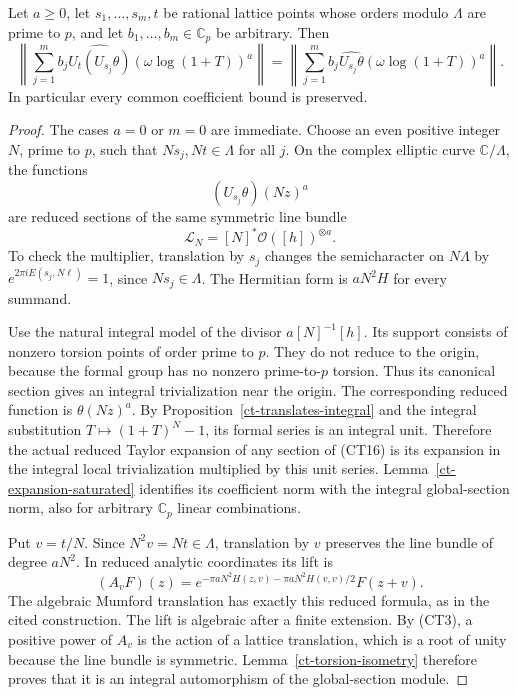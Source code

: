 \begin{theorem}\label{ct-combination-norm}
Let $a\ge0$, let $s_1,\ldots,s_m,t$ be rational lattice points
whose orders modulo $\Lambda$ are prime to $p$, and let
$b_1,\ldots,b_m\in\mathbb C_p$ be arbitrary.  Then
\[
 \left\|\sum_{j=1}^m b_j
       \widehat{U_t(U_{s_j}\theta)}
                         (\omega\log(1+T))^a\right\|
 =
 \left\|\sum_{j=1}^m b_j
       \widehat{U_{s_j}\theta}
                         (\omega\log(1+T))^a\right\|.
 \tag{CT15}
\]
In particular every common coefficient bound is preserved.
\end{theorem}
\begin{proof}
The cases $a=0$ or $m=0$ are immediate.  Choose an even positive
integer $N$, prime to $p$, such that $Ns_j,Nt\in\Lambda$ for
all $j$.  On the complex elliptic curve $\mathbb C/\Lambda$,
the functions
\[
                           (U_{s_j}\theta)(Nz)^a
\]
are reduced sections of the same symmetric line bundle
\[
              \mathscr L_N=[N]^*\mathcal O([h])^{\otimes a}.
 \tag{CT16}
\]
To check the multiplier, translation by $s_j$ changes the
semicharacter on $N\Lambda$ by
$e^{2\pi iE(s_j,N\ell)}=1$, since $Ns_j\in\Lambda$.
The Hermitian form is $aN^2H$ for every summand.

Use the natural integral model of the divisor
$a[N]^{-1}[h]$.  Its support consists of nonzero torsion points
of order prime to $p$.  They do not reduce to the origin, because
the formal group has no nonzero prime-to-$p$ torsion.  Thus its
canonical section gives an integral trivialization near the
origin.  The corresponding reduced function is
$\theta(Nz)^a$.  By Proposition~\ref{ct-translates-integral}
and the integral substitution $T\mapsto(1+T)^N-1$, its
formal series is an integral unit.  Therefore the actual
reduced Taylor expansion of any section of (CT16) is its
expansion in the integral local trivialization multiplied by
this unit series.  Lemma~\ref{ct-expansion-saturated} identifies
its coefficient norm with the integral global-section norm,
also for arbitrary $\mathbb C_p$ linear combinations.

Put $v=t/N$.  Since $N^2v=Nt\in\Lambda$, translation by $v$
preserves the line bundle of degree $aN^2$.  In reduced analytic
coordinates its lift is
\[
       (A_vF)(z)=e^{-\pi aN^2 H(z,v)-\pi aN^2H(v,v)/2}
                                                        F(z+v).
 \tag{CT17}
\]
The algebraic Mumford translation has exactly this reduced
formula, as in the cited construction.  The lift is algebraic
after a finite extension.  By (CT3), a positive power of $A_v$
is the action of a lattice translation, which is a root of
unity because the line bundle is symmetric.  Lemma~\ref{ct-torsion-isometry}
therefore proves that it is an integral automorphism of the
global-section module.


\end{proof}
